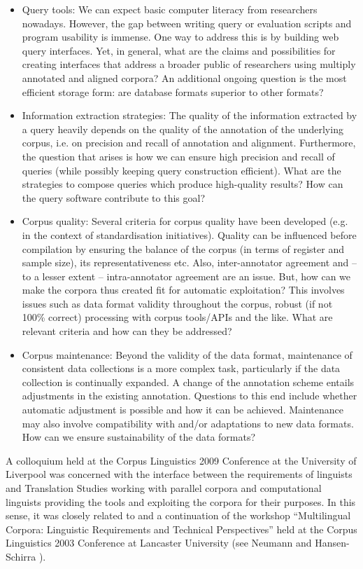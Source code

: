\documentclass[output=paper]{LSP/langsci}
\begin{document}
\begin{itemize}
\item 
Query tools: We can expect basic computer literacy from researchers nowadays. However, the gap between writing query or evaluation scripts and program usability is immense. One way to address this is by building web query interfaces. Yet, in general, what are the claims and possibilities for creating interfaces that address a broader public of researchers using multiply annotated and aligned corpora? An additional ongoing question is the most efficient storage form: are database formats superior to other formats? 
\newpage 
\item 
Information extraction strategies: The quality of the information extracted by a query heavily depends on the quality of the annotation of the underlying corpus, i.e. on precision and recall of annotation and alignment. Furthermore, the question that arises is how we can ensure high precision and recall of queries (while possibly keeping query construction efficient). What are the strategies to compose queries which produce high-quality results? How can the query software contribute to this goal? 
\item 
Corpus quality: Several criteria for corpus quality have been developed (e.g. in the context of standardisation initiatives). Quality can be influenced before compilation by ensuring the balance of the corpus (in terms of register and sample size), its representativeness etc. Also, inter-annotator agreement and -- to a lesser extent -- intra-annotator agreement are an issue. But, how can we make the corpora thus created fit for automatic exploitation? This involves issues such as data format validity throughout the corpus, robust (if not 100\% correct) processing with corpus tools/APIs and the like. What are relevant criteria and how can they be addressed? 
\item 
Corpus maintenance: Beyond the validity of the data format, maintenance of consistent data collections is a more complex task, particularly if the data collection is continually expanded. A change of the annotation scheme entails adjustments in the existing annotation. Questions to this end include whether automatic adjustment is possible and how it can be achieved. Maintenance may also involve compatibility with and/or adaptations to new data formats. How can we ensure sustainability of the data formats? 
\end{itemize}

A colloquium held at the Corpus Linguistics 2009 Conference at the University of Liverpool was concerned with the interface between the requirements of linguists and Translation Studies working with parallel corpora and computational linguists providing the tools and exploiting the corpora for their purposes. In this sense, it was closely related to and a continuation of the workshop ``Multilingual Corpora: Linguistic Requirements and Technical Perspectives'' held at the Corpus Linguistics 2003 Conference at Lancaster University (see Neumann and Hansen-Schirra \citealt{Neumann2003}).
\end{document}
